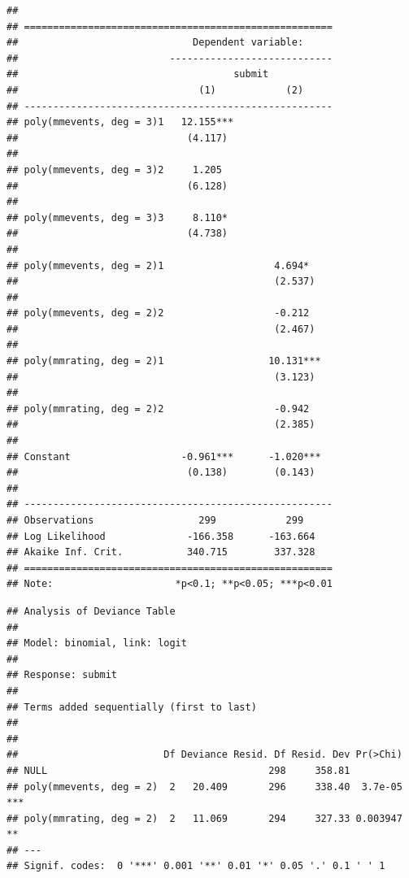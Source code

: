 \documentclass[12pt,]{article}
\theoremstyle{plain} %
\begin{document}
\begin{verbatim}
## 
## =====================================================
##                              Dependent variable:     
##                          ----------------------------
##                                     submit           
##                               (1)            (2)     
## -----------------------------------------------------
## poly(mmevents, deg = 3)1   12.155***                 
##                             (4.117)                  
##                                                      
## poly(mmevents, deg = 3)2     1.205                   
##                             (6.128)                  
##                                                      
## poly(mmevents, deg = 3)3     8.110*                  
##                             (4.738)                  
##                                                      
## poly(mmevents, deg = 2)1                   4.694*    
##                                            (2.537)   
##                                                      
## poly(mmevents, deg = 2)2                   -0.212    
##                                            (2.467)   
##                                                      
## poly(mmrating, deg = 2)1                  10.131***  
##                                            (3.123)   
##                                                      
## poly(mmrating, deg = 2)2                   -0.942    
##                                            (2.385)   
##                                                      
## Constant                   -0.961***      -1.020***  
##                             (0.138)        (0.143)   
##                                                      
## -----------------------------------------------------
## Observations                  299            299     
## Log Likelihood              -166.358      -163.664   
## Akaike Inf. Crit.           340.715        337.328   
## =====================================================
## Note:                     *p<0.1; **p<0.05; ***p<0.01
\end{verbatim}

\begin{verbatim}
## Analysis of Deviance Table
## 
## Model: binomial, link: logit
## 
## Response: submit
## 
## Terms added sequentially (first to last)
## 
## 
##                         Df Deviance Resid. Df Resid. Dev Pr(>Chi)    
## NULL                                      298     358.81             
## poly(mmevents, deg = 2)  2   20.409       296     338.40  3.7e-05 ***
## poly(mmrating, deg = 2)  2   11.069       294     327.33 0.003947 ** 
## ---
## Signif. codes:  0 '***' 0.001 '**' 0.01 '*' 0.05 '.' 0.1 ' ' 1
\end{verbatim}
\end{document}
